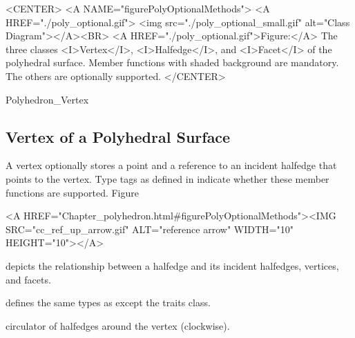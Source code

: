 \begin{ccHtmlOnly}
    <CENTER>
    <A NAME="figurePolyOptionalMethods">
    <A HREF="./poly_optional.gif">
        <img src="./poly_optional_small.gif" 
             alt="Class Diagram"></A><BR>
    <A HREF="./poly_optional.gif">Figure:</A>
    The three classes <I>Vertex</I>, <I>Halfedge</I>, and 
          <I>Facet</I> of the polyhedral surface. Member
          functions with shaded background are mandatory. The others
          are optionally supported.
    </CENTER>
\end{ccHtmlOnly}


\begin{ccClass}{Polyhedron_Vertex}
\subsection{Vertex of a Polyhedral Surface}

\ccDefinition

A vertex optionally stores a point and a reference to an incident
halfedge that points to the vertex.  Type tags  as defined in
 indicate whether these
member functions are supported.  
Figure~\ccTexHtml{\ref{figurePolyOptionalMethods}}{}\begin{ccHtmlOnly}
  <A HREF="Chapter_polyhedron.html#figurePolyOptionalMethods"><IMG 
  SRC="cc_ref_up_arrow.gif" ALT="reference arrow" WIDTH="10" HEIGHT="10"></A>
\end{ccHtmlOnly}
depicts the relationship between a halfedge and its incident halfedges,
vertices, and facets.


\ccTypes
{}
\ccThreeToTwo

 defines the same types as  except
the traits class.


\ccGlue
{}

    {circulator of halfedges around the vertex (clockwise).}

\end{ccClass}



